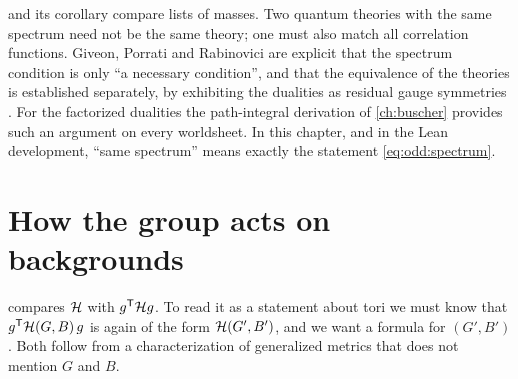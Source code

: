 \begin{pitfallbox}
 and its corollary compare lists of masses. Two quantum theories
with the same spectrum need not be the same theory; one must also match all correlation
functions. Giveon, Porrati and Rabinovici are explicit that the spectrum condition is only
``a necessary condition'', and that the equivalence of the theories is established
separately, by exhibiting the dualities as residual gauge symmetries . For the factorized dualities the path-integral derivation of
\cref{ch:buscher} provides such an argument on every worldsheet. In this chapter, and in the
Lean development, ``same spectrum'' means exactly the statement
\eqref{eq:odd:spectrum}.
\end{pitfallbox}

\section{How the group acts on backgrounds}\label{sec:odd:action}

 compares $\mathcal{H}$ with $g^{\mathsf T}\mathcal{H} g$. To read it as a statement
about tori we must know that $g^{\mathsf T}\mathcal{H}(G,B)\,g$ is again of the form
$\mathcal{H}(G',B')$, and we want a formula for $(G',B')$. Both follow from a characterization of
generalized metrics that does not mention $G$ and $B$.


